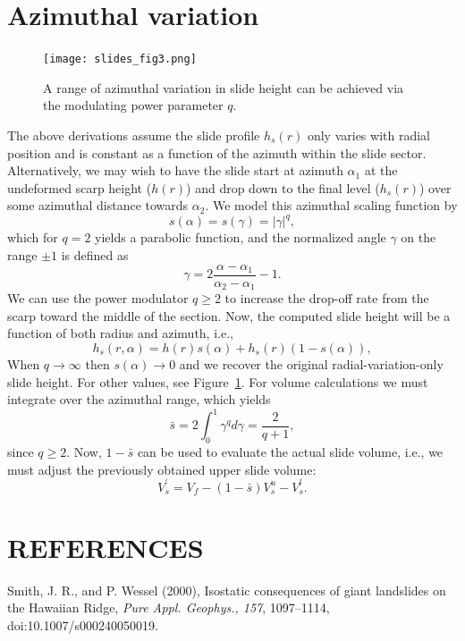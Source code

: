 \documentclass[12pt,letterpaper,margin=0.5in]{report}
\begin{document}
\section{Azimuthal variation}

\begin{figure}[h!]
  \centering
  \texttt{[image: slides\_fig3.png]}
  \caption{A range of azimuthal variation in slide height can be achieved via the modulating power parameter $q$.}
  \label{slides_fig3}
\end{figure}

The above derivations assume the slide profile $h_s(r)$ only varies with radial position and is constant as a function of the azimuth within the slide sector.
Alternatively, we may wish to have the slide start at azimuth $\alpha_1$ at the undeformed scarp height ($h(r)$) and drop down to the final level ($h_s(r)$)
over some azimuthal distance towards $\alpha_2$.  We model this azimuthal scaling function by
\begin{equation}
s(\alpha) = s(\gamma) = \left |\gamma\right|^q,
\end{equation}
which for $q = 2$ yields a parabolic function, and the normalized angle $\gamma$ on the range $\pm1$ is defined as
\begin{equation}
\gamma = 2\frac{\alpha - \alpha_1}{\alpha_2 - \alpha_1} - 1.
\end{equation}
We can use the power modulator $q \ge 2$ to increase the drop-off rate from the scarp toward the middle of the section. Now, the computed slide height will be a function
of both radius and azimuth, i.e.,
\begin{equation}
h_s(r, \alpha) = h(r) s(\alpha) + h_s(r) (1 - s(\alpha)),
\end{equation}
When $q \rightarrow \infty$ then $s(\alpha) \rightarrow 0$ and we recover the original radial-variation-only slide height. For other values,
see Figure~\ref{slides_fig3}.
For volume calculations we must integrate over the azimuthal range, which yields
\begin{equation}
\bar{s} = 2\int_0^1  \gamma^q d\gamma = \frac{2}{q+1},
\end{equation}
since $q \ge 2$. Now, $1 - \bar{s}$ can be used to evaluate the actual slide volume, i.e., we must adjust the previously obtained upper slide volume:
\begin{equation}
V_s^' = V_f - (1 - \bar{s}) V^u_s - V^l_s.
\end{equation}

\section{REFERENCES}

Smith, J. R., and P. Wessel (2000), Isostatic consequences of giant landslides on the Hawaiian Ridge,
{\it Pure Appl. Geophys., 157}, 1097--1114, doi:10.1007/s000240050019.
\end{document}
